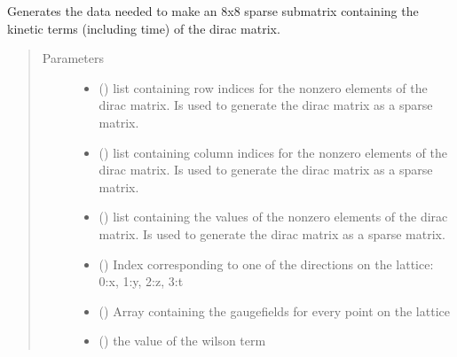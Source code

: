 \documentclass[letterpaper,10pt,english]{sphinxmanual}
\begin{document}

\begin{fulllineitems}
\label{\detokenize{index:su2.initD}}
Generates the data needed to make an 8x8 sparse submatrix
containing the kinetic terms (including time) of the dirac matrix.
\begin{quote}\begin{description}
\item[{Parameters}] \leavevmode\begin{itemize}
\item {} 
 () \textendash{} list containing row indices for the non\sphinxhyphen{}zero elements of the
dirac matrix. Is used to generate the dirac matrix as a sparse
matrix.

\item {} 
 () \textendash{} list containing column indices for the non\sphinxhyphen{}zero elements of the
dirac matrix. Is used to generate the dirac matrix as a sparse
matrix.

\item {} 
 () \textendash{} list containing the values of the non\sphinxhyphen{}zero elements of the
dirac matrix. Is used to generate the dirac matrix as a sparse
matrix.

\item {} 
 () \textendash{} Index corresponding to one of the directions on the lattice:
0:x, 1:y, 2:z, 3:t

\item {} 
 () \textendash{} Array containing the gaugefields for every point on the lattice

\item {} 
 () \textendash{} the value of the wilson term


\end{itemize}
\end{description}
\end{quote}
\end{fulllineitems}
\end{document}
